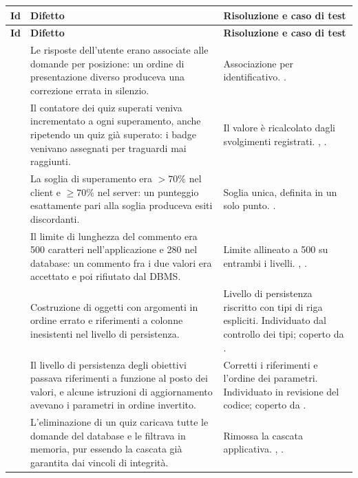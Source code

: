 \begin{longtable}{@{}l L{5.6cm} L{6.4cm}@{}}
\toprule
\textbf{Id} & \textbf{Difetto} & \textbf{Risoluzione e caso di test} \\
\midrule
\endfirsthead
\toprule
\textbf{Id} & \textbf{Difetto} & \textbf{Risoluzione e caso di test} \\
\midrule
\endhead
\bottomrule
\endlastfoot

 &
Le risposte dell'utente erano associate alle domande per posizione: un ordine
di presentazione diverso produceva una correzione errata in silenzio. &
Associazione per identificativo. . \\

 &
Il contatore dei quiz superati veniva incrementato a ogni superamento, anche
ripetendo un quiz già superato: i badge venivano assegnati per traguardi mai
raggiunti. &
Il valore è ricalcolato dagli svolgimenti registrati.
, . \\

 &
La soglia di superamento era $> 70\%$ nel client e $\ge 70\%$ nel server: un
punteggio esattamente pari alla soglia produceva esiti discordanti. &
Soglia unica, definita in un solo punto. . \\

 &
Il limite di lunghezza del commento era 500 caratteri nell'applicazione e 280
nel database: un commento fra i due valori era accettato e poi rifiutato dal
DBMS. &
Limite allineato a 500 su entrambi i livelli.
, . \\

 &
Costruzione di oggetti  con argomenti in ordine errato e
riferimenti a colonne inesistenti nel livello di persistenza. &
Livello di persistenza riscritto con tipi di riga espliciti.
Individuato dal controllo dei tipi; coperto da . \\

 &
Il livello di persistenza degli obiettivi passava riferimenti a funzione al
posto dei valori, e alcune istruzioni di aggiornamento avevano i parametri in
ordine invertito. &
Corretti i riferimenti e l'ordine dei parametri. Individuato in revisione del
codice; coperto da . \\

 &
L'eliminazione di un quiz caricava tutte le domande del database e le
filtrava in memoria, pur essendo la cascata già garantita dai vincoli di
integrità. &
Rimossa la cascata applicativa. , . \\

\end{longtable}


